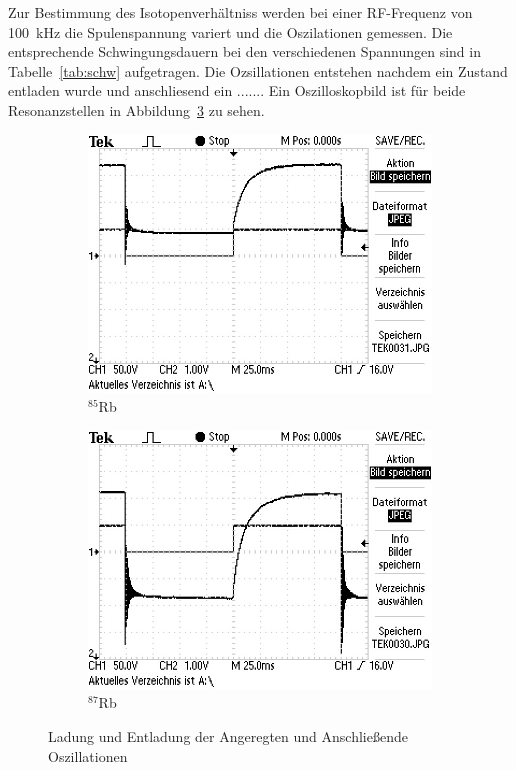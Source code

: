 Zur Bestimmung des Isotopenverhältniss werden bei einer RF-Frequenz von
\SI{100}{\kilo\hertz} die Spulenspannung variert und die Oszilationen gemessen.
Die entsprechende Schwingungsdauern bei den verschiedenen Spannungen sind in
Tabelle~\ref{tab:schw} aufgetragen.
Die Ozsillationen entstehen nachdem ein Zustand entladen wurde und anschliesend
ein .......
Ein Oszilloskopbild ist für beide Resonanzstellen in Abbildung~\ref{fig:osz} zu
sehen.
\begin{figure}[h]
	\centering
	\begin{subfigure}[c]{0.45\textwidth}
	\begin{center}
	\includegraphics[width=\textwidth]{./picture/Peak_1.JPG}
	\end{center}
	\caption{$^{85}$Rb}
	\label{fig:}
	\end{subfigure}
	\begin{subfigure}[c]{0.45\textwidth}
	\begin{center}
	\includegraphics[width=\textwidth]{./picture/Peak_2.JPG}
	\end{center}
	\caption{$^{87}$Rb}
	\label{fig:}
	\end{subfigure}
	\caption{Ladung und Entladung der Angeregten und Anschließende Oszillationen}
	\label{fig:osz}
\end{figure}
